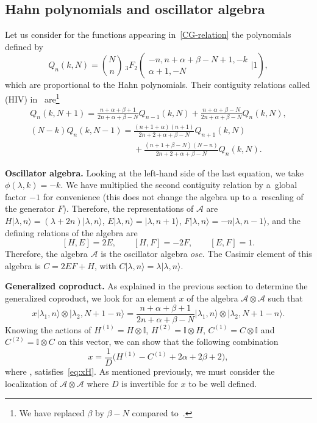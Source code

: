 \documentclass[pdftex]{sigma}
\numberwithin{equation}{section}
\theoremstyle{definition}
\begin{document}
\subsection{Hahn polynomials and oscillator algebra} \label{sec:Hahn}

Let us consider for the functions appearing in~\eqref{CG-relation} the polynomials defined by
\[Q_n(k,N)=\binom{N}{n}\ {}_3F_2\left(\begin{array}{c} -n, n+\alpha+\beta-N+1, -k \\ \alpha+1, -N\end{array}\Bigg\vert 1\right),\]
which are proportional to the Hahn polynomials.
Their contiguity relations called (HIV) in~\cite{contiguity} are\footnote{We have replaced $\beta$ by $\beta-N$ compared to~\cite{contiguity}.}
\begin{gather*}
Q_n(k,N+1)=\frac{n+\alpha+\beta+1}{2n+\alpha+\beta-N}Q_{n-1}(k,N)+\frac{n+\alpha+\beta-N}{2n+\alpha+\beta-N}Q_n(k,N),\\
(N-k)Q_n(k,N-1)=\frac{(n+1+\alpha)(n+1)}{2n+2+\alpha+\beta-N}Q_{n+1}(k,N)\\
\phantom{(N-k)Q_n(k,N-1)=}{}+\frac{(n+1+\beta-N)(N-n)}{2n+2+\alpha+\beta-N}Q_n(k,N).
\end{gather*}


{\bf Oscillator algebra.} Looking at the left-hand side of the last equation, we take
${\phi(\lambda,k)=-k}$.
We have multiplied the second contiguity relation by a~global factor $-1$ for convenience (this does not change the algebra up to a~rescaling of the generator $F$). Therefore, the representations of $\mathcal{A}$ are
$H|\lambda,n\rangle=(\lambda+2n)|\lambda,n\rangle$, $E|\lambda,n\rangle=|\lambda,n+1\rangle$, $F|\lambda,n\rangle=-n|\lambda,n-1\rangle$,
and the defining relations of the algebra are
\begin{equation}\label{eq:osc}
[H,E]=2E, \qquad [H,F]=-2F, \qquad [E,F]=1.
\end{equation}
Therefore, the algebra $\mathcal{A}$ is the oscillator algebra $osc$. The Casimir element of this algebra is
$C=2EF+H$, with $ C|\lambda,n\rangle=\lambda|\lambda,n\rangle $.

{\bf Generalized coproduct.} As explained in the previous section to determine the generalized coproduct, we look for an element $x$ of the algebra $\mathcal{A}\otimes\mathcal{A}$ such that
\begin{equation}\label{eq:xH}
 x|\lambda_1,n\rangle\otimes |\lambda_2,N+1-n\rangle=\frac{n+\alpha+\beta+1}{2n+\alpha+\beta-N}|\lambda_1,n\rangle\otimes |\lambda_2,N+1-n\rangle.
\end{equation}
Knowing the actions of $H^{(1)}=H\otimes \mathbb{I}$, $H^{(2)}=\mathbb{I} \otimes H$, $C^{(1)}=C\otimes \mathbb{I}$ and $C^{(2)}=\mathbb{I} \otimes C$ on this vector, we can show that the following combination
\[
 x=\frac{1}{D}\bigl(H^{(1)}-C^{(1)}+2\alpha+2\beta+2\bigr),\]
where , satisfies~\eqref{eq:xH}. As mentioned previously, we must consider the localization of $\mathcal{A}\otimes\mathcal{A}$ where $D$ is invertible for $x$ to be well defined.
\end{document}
